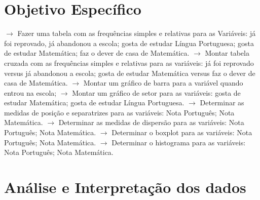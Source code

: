 \documentclass[17pt]{extarticle}
\begin{document}
\section{Objetivo Específico}
$\rightarrow$ Fazer uma tabela com as frequências simples e relativas para as Variáveis: já foi reprovado, já abandonou a escola; gosta de estudar Língua Portuguesa; gosta de estudar Matemática; faz o dever de casa de Matemática.\newline
$\rightarrow$ Montar tabela cruzada com as frequências simples e relativas para as variáveis: já foi reprovado versus já abandonou a escola; gosta de estudar Matemática versus faz o dever de casa de Matemática.\newline
$\rightarrow$ Montar um gráfico de barra para a variável quando entrou na escola;\newline
$\rightarrow$ Montar um gráfico de setor para as variáveis: gosta de estudar Matemática; gosta de estudar Língua Portuguesa.\newline
$\rightarrow$ Determinar as medidas de posição e separatrizes para as variáveis: Nota Português; Nota Matemática.\newline
$\rightarrow$ Determinar as medidas de dispersão para as variáveis: Nota Português; Nota Matemática.\newline
$\rightarrow$ Determinar o boxplot para as variáveis: Nota Português; Nota Matemática.\newline
$\rightarrow$ Determinar o histograma para as variáveis: Nota Português; Nota Matemática.\newline

\newpage
\section{Análise e Interpretação dos dados}
\end{document}
